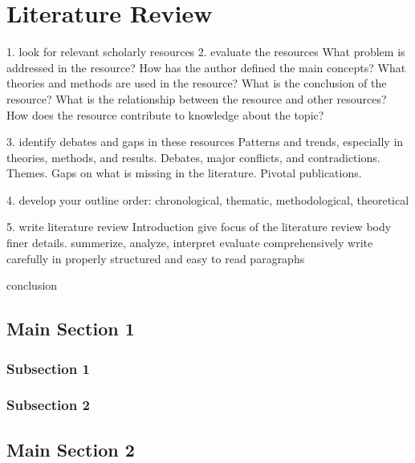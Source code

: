 
\chapter{Literature Review} %

\label{Chapter2} %


1. look for relevant scholarly resources
2. evaluate the resources 
    What problem is addressed in the resource?
    How has the author defined the main concepts?
    What theories and methods are used in the resource?
    What is the conclusion of the resource?
    What is the relationship between the resource and other resources?
    How does the resource contribute to knowledge about the topic?

3. identify debates and gaps in these resources
    Patterns and trends, especially in theories, methods, and results.
    Debates, major conflicts, and contradictions.
    Themes.
    Gaps on what is missing in the literature.
    Pivotal publications.


4. develop your outline
order: chronological, thematic, methodological, theoretical
    

5. write literature review
    Introduction
        give focus of the literature review
    body
        finer details.
        summerize, analyze, interpret
        evaluate comprehensively
        write carefully in properly structured and easy to read paragraphs
        
    conclusion


\section{Main Section 1}
\subsection{Subsection 1}



\subsection{Subsection 2}


\section{Main Section 2}
